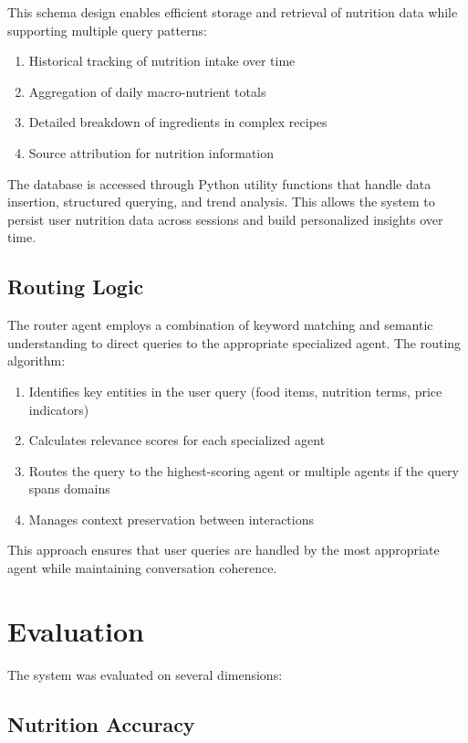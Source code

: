 \documentclass{ecai}
\begin{document}
This schema design enables efficient storage and retrieval of nutrition data while supporting multiple query patterns:

\begin{enumerate}[noitemsep,topsep=0pt]
    \item Historical tracking of nutrition intake over time
    \item Aggregation of daily macro-nutrient totals
    \item Detailed breakdown of ingredients in complex recipes
    \item Source attribution for nutrition information
\end{enumerate}

The database is accessed through Python utility functions that handle data insertion, structured querying, and trend analysis. This allows the system to persist user nutrition data across sessions and build personalized insights over time.

\subsection{Routing Logic}

The router agent employs a combination of keyword matching and semantic understanding to direct queries to the appropriate specialized agent. The routing algorithm:

\begin{enumerate}[noitemsep,topsep=0pt]
    \item Identifies key entities in the user query (food items, nutrition terms, price indicators)
    \item Calculates relevance scores for each specialized agent
    \item Routes the query to the highest-scoring agent or multiple agents if the query spans domains
    \item Manages context preservation between interactions
\end{enumerate}

This approach ensures that user queries are handled by the most appropriate agent while maintaining conversation coherence.

\section{Evaluation}

The system was evaluated on several dimensions:

\subsection{Nutrition Accuracy}
\end{document}
